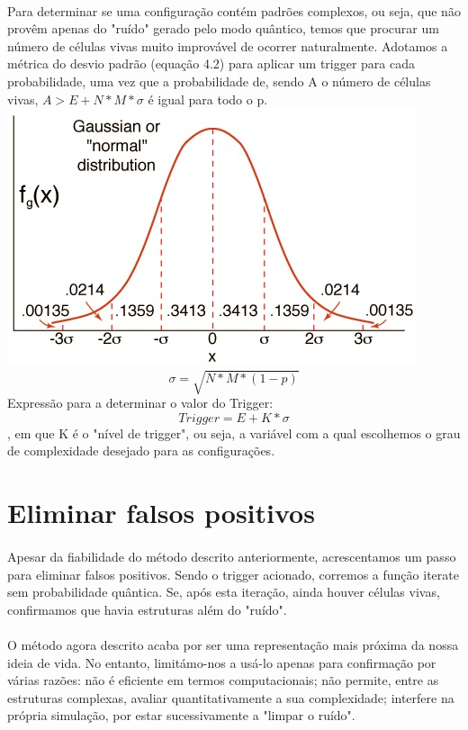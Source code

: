 \documentclass[a4paper,11pt]{book}
\begin{document}
\paragraph{}Para determinar se uma configuração contém padrões complexos, ou seja, que não provêm apenas do "ruído" gerado pelo modo quântico, temos que procurar um número de células vivas muito improvável de ocorrer naturalmente. Adotamos a métrica do desvio padrão (equação 4.2) para aplicar um trigger para cada probabilidade, uma vez que a probabilidade de, sendo A o número de células vivas, $A > E + N*M*\sigma$ é igual para todo o p.
\includegraphics[scale = 0.7]{gaussian}
\begin{equation}
    \sigma = \sqrt{N*M*(1-p)}
\end{equation}
Expressão para a determinar o valor do Trigger:
\begin{equation}
    Trigger = E + K*\sigma
\end{equation}
, em que K é o "nível de trigger", ou seja, a variável com a qual escolhemos o grau de complexidade desejado para as configurações.
\section{Eliminar falsos positivos}
\paragraph{}Apesar da fiabilidade do método descrito anteriormente, acrescentamos um passo para eliminar falsos positivos. Sendo o trigger acionado, corremos a função iterate sem probabilidade quântica. Se, após esta iteração, ainda houver células vivas, confirmamos que havia estruturas além do "ruído".
\paragraph{}O método agora descrito acaba por ser uma representação mais próxima da nossa ideia de vida. No entanto, limitámo-nos a usá-lo apenas para confirmação por várias razões: não é eficiente em termos computacionais; não permite, entre as estruturas complexas, avaliar quantitativamente a sua complexidade; interfere na própria simulação, por estar sucessivamente a "limpar o ruído".
\newpage
\end{document}
